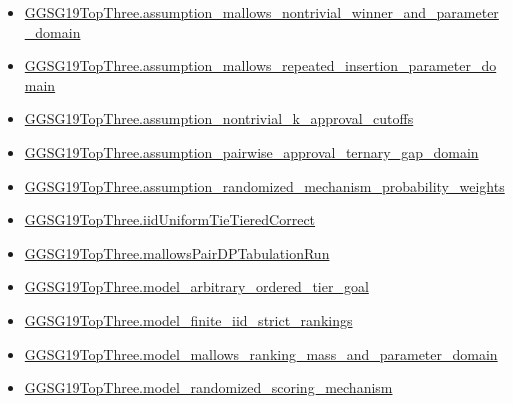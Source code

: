 \documentclass[10pt]{article}
\begin{document}
\begin{itemize}[leftmargin=1.2em]
\begin{itemize}[leftmargin=1.2em]
\item \hyperlink{paper-prerequisite-295f37487ff2fcbb}{GGSG19\allowbreak{}Top\allowbreak{}Three.\allowbreak{}assumption\_\allowbreak{}mallows\_\allowbreak{}nontrivial\_\allowbreak{}winner\_\allowbreak{}and\_\allowbreak{}parameter\_\allowbreak{}domain}
\item \hyperlink{paper-prerequisite-6aeda38fed7688bf}{GGSG19\allowbreak{}Top\allowbreak{}Three.\allowbreak{}assumption\_\allowbreak{}mallows\_\allowbreak{}repeated\_\allowbreak{}insertion\_\allowbreak{}parameter\_\allowbreak{}domain}
\item \hyperlink{paper-prerequisite-a8b4dc8cfb620b30}{GGSG19\allowbreak{}Top\allowbreak{}Three.\allowbreak{}assumption\_\allowbreak{}nontrivial\_\allowbreak{}k\_\allowbreak{}approval\_\allowbreak{}cutoffs}
\item \hyperlink{paper-prerequisite-8948b8668b936c60}{GGSG19\allowbreak{}Top\allowbreak{}Three.\allowbreak{}assumption\_\allowbreak{}pairwise\_\allowbreak{}approval\_\allowbreak{}ternary\_\allowbreak{}gap\_\allowbreak{}domain}
\item \hyperlink{paper-prerequisite-bc03c0ece90c6b75}{GGSG19\allowbreak{}Top\allowbreak{}Three.\allowbreak{}assumption\_\allowbreak{}randomized\_\allowbreak{}mechanism\_\allowbreak{}probability\_\allowbreak{}weights}
\item \hyperlink{paper-prerequisite-0e1a32dc76fa50be}{GGSG19\allowbreak{}Top\allowbreak{}Three.\allowbreak{}iid\allowbreak{}Uniform\allowbreak{}Tie\allowbreak{}Tiered\allowbreak{}Correct}
\item \hyperlink{paper-prerequisite-cbea3bf86e6262ff}{GGSG19\allowbreak{}Top\allowbreak{}Three.\allowbreak{}mallows\allowbreak{}Pair\allowbreak{}DP\allowbreak{}Tabulation\allowbreak{}Run}
\item \hyperlink{paper-prerequisite-ad3f6b9cc11c88e1}{GGSG19\allowbreak{}Top\allowbreak{}Three.\allowbreak{}model\_\allowbreak{}arbitrary\_\allowbreak{}ordered\_\allowbreak{}tier\_\allowbreak{}goal}
\item \hyperlink{paper-prerequisite-9cdfd167c7e65bdc}{GGSG19\allowbreak{}Top\allowbreak{}Three.\allowbreak{}model\_\allowbreak{}finite\_\allowbreak{}iid\_\allowbreak{}strict\_\allowbreak{}rankings}
\item \hyperlink{paper-prerequisite-fccf8d59da117c80}{GGSG19\allowbreak{}Top\allowbreak{}Three.\allowbreak{}model\_\allowbreak{}mallows\_\allowbreak{}ranking\_\allowbreak{}mass\_\allowbreak{}and\_\allowbreak{}parameter\_\allowbreak{}domain}
\item \hyperlink{paper-prerequisite-b7a46ff7982a8c81}{GGSG19\allowbreak{}Top\allowbreak{}Three.\allowbreak{}model\_\allowbreak{}randomized\_\allowbreak{}scoring\_\allowbreak{}mechanism}

\end{itemize}
\end{itemize}
\end{document}
